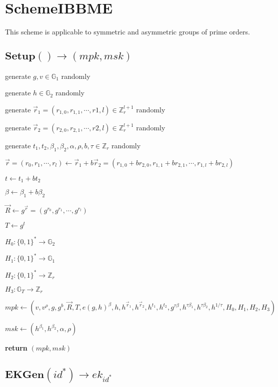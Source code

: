 \documentclass[a4paper]{article}
\begin{document}
\section{SchemeIBBME}

This scheme is applicable to symmetric and asymmetric groups of prime orders. 

\subsection{$\textbf{Setup}() \rightarrow (\textit{mpk}, \textit{msk})$}

generate $g, v \in \mathbb{G}_1$ randomly

generate $h \in \mathbb{G}_2$ randomly

generate $\vec{r}_1 = (r_{1, 0}, r_{1, 1}, \cdots, r{1, l}) \in \mathbb{Z}_r^{l + 1}$ randomly

generate $\vec{r}_2 = (r_{2, 0}, r_{2, 1}, \cdots, r{2, l}) \in \mathbb{Z}_r^{l + 1}$ randomly

generate $t_1, t_2, \beta_1, \beta_2, \alpha, \rho, b, \tau \in \mathbb{Z}_r$ randomly

$\vec{r} = (r_0, r_1, \cdots, r_l) \gets \vec{r}_1 + b\vec{r}_2 = (r_{1, 0} + br_{2, 0}, r_{1, 1} + br_{2, 1}, \cdots, r_{1, l} + br_{2, l})$

$t \gets t_1 + bt_2$

$\beta \gets \beta_1 + b\beta_2$

$\vec{R} \gets g^{\vec{r}} = (g^{r_0}, g^{r_1}, \cdots, g^{r_l})$

$T \gets g^t$

$H_0: \{0, 1\}^* \rightarrow \mathbb{G}_2$

$H_1: \{0, 1\}^* \rightarrow \mathbb{G}_1$

$H_2: \{0, 1\}^* \rightarrow \mathbb{Z}_r$

$H_3: \mathbb{G}_T \rightarrow \mathbb{Z}_r$

$\textit{mpk} \gets (v, v^\rho, g, g^b, \vec{R}, T, e(g, h)^\beta, h, h^{\vec{r}_1}, h^{\vec{r}_2}, h^{t_1}, h^{t_2}, g^{\tau\beta}, h^{\tau\beta_1}, h^{\tau\beta_2}, h^{1/\tau}, H_0, H_1, H_2, H_3)$

$\textit{msk} \gets (h^{\beta_1}, h^{\beta_2}, \alpha, \rho)$

\textbf{return} $(\textit{mpk}, \textit{msk})$

\subsection{$\textbf{EKGen}(\textit{id}^*) \rightarrow \textit{ek}_{\textit{id}^*}$}
\end{document}
